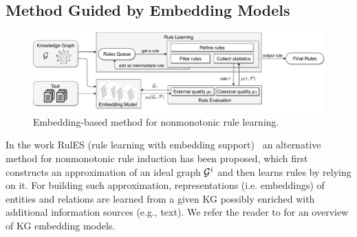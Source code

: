 


\subsection{Method Guided by Embedding Models}
  \begin{figure}[t]
\centering
\includegraphics[width=1\textwidth]{figures/rules_overview_H.pdf}
\caption{Embedding-based method for nonmonotonic rule learning.}
\label{fig:system}
\end{figure}


In the work RulES (rule learning with embedding support)~\cite{thinh2018} an alternative method for nonmonotonic rule induction has been proposed, which first constructs an approximation of an ideal graph $\mathcal{G}^i$ and then learns rules by relying on it. For building such approximation, representations (i.e. embeddings) of entities and relations are learned from a given KG possibly enriched with additional information sources (e.g., text). We refer the reader to \cite{Wang2017} for an overview of KG embedding models. %

